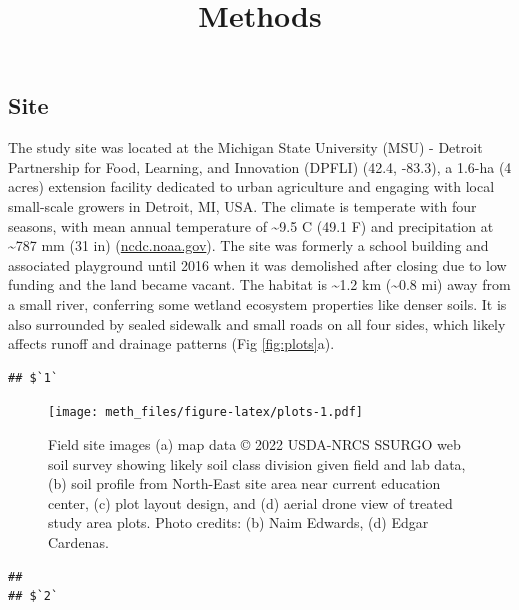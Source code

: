 \documentclass[
]{article}
\title{Methods}
\author{}
\date{\vspace{-2.5em}}
\begin{document}
\maketitle

\hypertarget{site}{%
\subsection{Site}\label{site}}

The study site was located at the Michigan State University (MSU) - Detroit Partnership for Food, Learning, and Innovation (DPFLI) (42.4, -83.3), a 1.6-ha (4 acres) extension facility dedicated to urban agriculture and engaging with local small-scale growers in Detroit, MI, USA.
The climate is temperate with four seasons, with mean annual temperature of \textasciitilde9.5 C (49.1 F) and precipitation at \textasciitilde787 mm (31 in) (\url{ncdc.noaa.gov}).
The site was formerly a school building and associated playground until 2016 when it was demolished after closing due to low funding and the land became vacant.
The habitat is \textasciitilde1.2 km (\textasciitilde0.8 mi) away from a small river, conferring some wetland ecosystem properties like denser soils.
It is also surrounded by sealed sidewalk and small roads on all four sides, which likely affects runoff and drainage patterns (Fig \ref{fig:plots}a).

\begin{verbatim}
## $`1`
\end{verbatim}

\begin{figure}
\centering
\texttt{[image: meth\_files/figure-latex/plots-1.pdf]}
\caption{\label{fig:plots-1}Field site images (a) map data © 2022 USDA-NRCS SSURGO web soil survey showing likely soil class division given field and lab data, (b) soil profile from North-East site area near current education center, (c) plot layout design, and (d) aerial drone view of treated study area plots. Photo credits: (b) Naim Edwards, (d) Edgar Cardenas.}
\end{figure}

\begin{verbatim}
## 
## $`2`
\end{verbatim}
\end{document}
